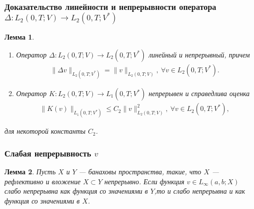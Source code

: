 \documentclass[10pt, pdf, hyperref={unicode}]{beamer}
\newtheorem{ru_lemma}{Лемма}
\renewenvironment{lemma}{\begin{ru_lemma}}{\end{ru_lemma}}
\begin{document}
  \begin{frame}
    \frametitle{Доказательство линейности и непрерывности оператора $\Delta:L_2 (0,T;V)→L_2 (0,T;V^*)$}
    \begin{center}
      \begin{minipage}[h]{0.97\linewidth}
      \begin{lemma} ~\\
    \begin{enumerate}
        \item Оператор $\Delta: L_2(0, T; V) \rightarrow L_2(0, T; V^\ast)$ линейный и\linebreak
        непрерывный, причем
        \begin{equation}\label{eq:5.9}
            \begin{gathered}
                \| \Delta v \|_{L_2(0, T; V^\ast)} = \| v \|_{L_2(0, T; V)}, \ \forall v \in L_2(0, T; V^\ast).
            \end{gathered}
        \end{equation}
        \item Оператор $K: L_2(0, T; V) \rightarrow L_1(0, T; V^\ast)$ непрерывен и справедлива оценка
        \begin{equation}\label{eq:5.10}
            \begin{gathered}
                \| K(v) \|_{L_1(0, T; V^\ast)} \leqslant C_2\| v \|^2_{L_2(0, T;V)}, \ \forall v \in L_2(0, T; V^\ast),
            \end{gathered}
        \end{equation}
    \end{enumerate}
    для некоторой константы $C_2$.
\end{lemma}
      \end{minipage}
    \end{center}
  \end{frame}

\begin{frame}
    \frametitle{Слабая непрерывность $v$}
    \begin{center}
      \begin{minipage}[h]{0.97\linewidth}
        \begin{lemma}
          Пусть $X$ и $Y$ --- банаховы пространства, такие, что $X$ --- рефлективно и вложение $X\subset Y$ непрерывно.
          Если функция $v\in L_{\infty}(a,b;X)$ слабо непрерывна как функция со значениями в $Y$,то и слабо непрерывна и как функция со значениями в $X$.
        \end{lemma}
      \end{minipage}
    \end{center}
  \end{frame}
\end{document}
